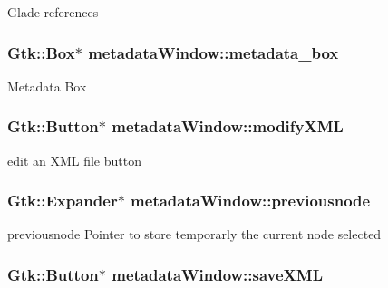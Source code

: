 Glade references \hypertarget{classmetadataWindow_a1b4bbe65be89497dfcccc1c6a25cdfe7}{
\subsubsection[{metadata\-\_\-box}]{\setlength{\rightskip}{0pt plus 5cm}Gtk\-::\-Box$\ast$ metadata\-Window\-::metadata\-\_\-box\hspace{0.3cm}{\ttfamily [protected]}}}\label{classmetadataWindow_a1b4bbe65be89497dfcccc1c6a25cdfe7}
Metadata Box \hypertarget{classmetadataWindow_a6243706a8b1e55b9125f785af8bdf83b}{
\subsubsection[{modify\-X\-M\-L}]{\setlength{\rightskip}{0pt plus 5cm}Gtk\-::\-Button$\ast$ metadata\-Window\-::modify\-X\-M\-L\hspace{0.3cm}{\ttfamily [protected]}}}\label{classmetadataWindow_a6243706a8b1e55b9125f785af8bdf83b}
edit an X\-M\-L file button \hypertarget{classmetadataWindow_a2455df9286c750582afdbcee85abc2ca}{
\subsubsection[{previousnode}]{\setlength{\rightskip}{0pt plus 5cm}Gtk\-::\-Expander$\ast$ metadata\-Window\-::previousnode\hspace{0.3cm}{\ttfamily [protected]}}}\label{classmetadataWindow_a2455df9286c750582afdbcee85abc2ca}
previousnode Pointer to store temporarly the current node selected \hypertarget{classmetadataWindow_ab38d435ed3b41749f31bd1b04fbc370a}{
\subsubsection[{save\-X\-M\-L}]{\setlength{\rightskip}{0pt plus 5cm}Gtk\-::\-Button$\ast$ metadata\-Window\-::save\-X\-M\-L\hspace{0.3cm}{\ttfamily [protected]}}}\label{classmetadataWindow_ab38d435ed3b41749f31bd1b04fbc370a}
